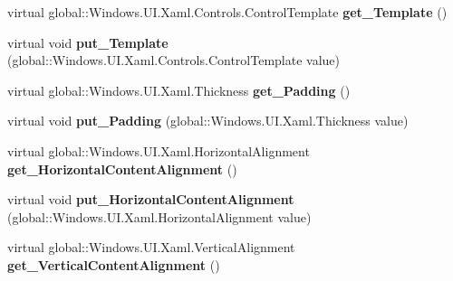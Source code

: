 \begin{DoxyCompactItemize}
\mbox{\label{class_windows_1_1_u_i_1_1_xaml_1_1_controls_1_1_control_a2e40dea64382201f30a45dc2c9db69be}} 
virtual global\+::\+Windows.\+U\+I.\+Xaml.\+Controls.\+Control\+Template {\bfseries get\+\_\+\+Template} ()
\item 
\mbox{\label{class_windows_1_1_u_i_1_1_xaml_1_1_controls_1_1_control_adc937135b0249a6d3425011c1b394db2}} 
virtual void {\bfseries put\+\_\+\+Template} (global\+::\+Windows.\+U\+I.\+Xaml.\+Controls.\+Control\+Template value)
\item 
\mbox{\label{class_windows_1_1_u_i_1_1_xaml_1_1_controls_1_1_control_ae5ac1dbce8d9d993ed0c6ef90a22159d}} 
virtual global\+::\+Windows.\+U\+I.\+Xaml.\+Thickness {\bfseries get\+\_\+\+Padding} ()
\item 
\mbox{\label{class_windows_1_1_u_i_1_1_xaml_1_1_controls_1_1_control_a6898d6903b57a058dd5fb8ef28c5ec58}} 
virtual void {\bfseries put\+\_\+\+Padding} (global\+::\+Windows.\+U\+I.\+Xaml.\+Thickness value)
\item 
\mbox{\label{class_windows_1_1_u_i_1_1_xaml_1_1_controls_1_1_control_ab75bd10489d1a9f3060a3d3d8c060dbd}} 
virtual global\+::\+Windows.\+U\+I.\+Xaml.\+Horizontal\+Alignment {\bfseries get\+\_\+\+Horizontal\+Content\+Alignment} ()
\item 
\mbox{\label{class_windows_1_1_u_i_1_1_xaml_1_1_controls_1_1_control_a529faaf72afad384ebe1f02f4b794a09}} 
virtual void {\bfseries put\+\_\+\+Horizontal\+Content\+Alignment} (global\+::\+Windows.\+U\+I.\+Xaml.\+Horizontal\+Alignment value)
\item 
\mbox{\label{class_windows_1_1_u_i_1_1_xaml_1_1_controls_1_1_control_a7006e185e4500ff498f82b3f44fd79fa}} 
virtual global\+::\+Windows.\+U\+I.\+Xaml.\+Vertical\+Alignment {\bfseries get\+\_\+\+Vertical\+Content\+Alignment} ()
\item 
\mbox{\label{class_windows_1_1_u_i_1_1_xaml_1_1_controls_1_1_control_af756ef0a995189ff771e3537a5391b42}} 

\end{DoxyCompactItemize}
